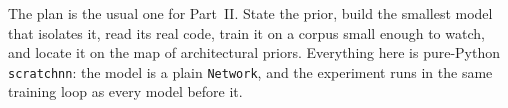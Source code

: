 The plan is the usual one for Part~II. State the prior, build the
smallest model that isolates it, read its real code, train it on a corpus
small enough to watch, and locate it on the map of architectural priors.
Everything here is pure-Python \texttt{scratchnn}: the model is a plain
\texttt{Network}, and the experiment runs in the same training loop as
every model before it.






